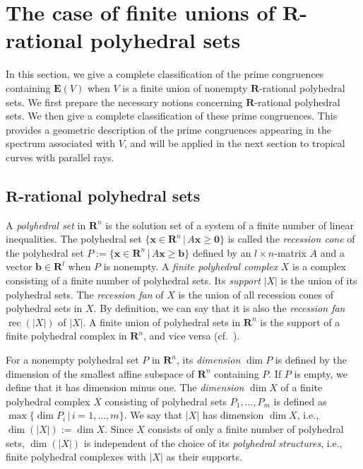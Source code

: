 \documentclass[a4paper,12pt]{amsart}
\theoremstyle{plain}
\theoremstyle{definition}
\begin{document}
\section{The case of finite unions of $\boldsymbol{R}$-rational polyhedral sets}
    \label{section4}

In this section, we give a complete classification of the prime congruences containing $\boldsymbol{E}(V)$ when $V$ is a finite union of nonempty $\boldsymbol{R}$-rational polyhedral sets.
We first prepare the necessary notions concerning $\boldsymbol{R}$-rational polyhedral sets.
We then give a complete classification of these prime congruences.
This provides a geometric description of the prime congruences appearing in the spectrum associated with $V$, and will be applied in the next section to tropical curves with parallel rays.

\subsection{$\boldsymbol{R}$-rational polyhedral sets}
    \label{subsection4.1}

A \textit{polyhedral set} in $\boldsymbol{R}^n$ is the solution set of a system of a finite number of linear inequalities.
The polyhedral set $\{ \boldsymbol{x} \in \boldsymbol{R}^n \,|\, A \boldsymbol{x} \ge \boldsymbol{0} \}$ is called the \textit{recession cone} of the polyhedral set $P := \{ \boldsymbol{x} \in \boldsymbol{R}^n \,|\, A \boldsymbol{x} \ge \boldsymbol{b} \}$ defined by an $l \times n$-matrix $A$ and a vector $\boldsymbol{b} \in \boldsymbol{R}^l$ when $P$ is nonempty.
A \textit{finite polyhedral complex} $X$ is a complex consisting of a finite number of polyhedral sets.
Its \textit{support} $|X|$ is the union of its polyhedral sets.
The \textit{recession fan} of $X$ is the union of all recession cones of polyhedral sets in $X$.
By definition, we can say that it is also the \textit{recession fan} $\operatorname{rec}(|X|)$ of $|X|$.
A finite union of polyhedral sets in $\boldsymbol{R}^n$ is the support of a finite polyhedral complex in $\boldsymbol{R}^n$, and vice versa (cf.~\cite[Proposition~4.1.1(a)]{Mikhalkin=Rau}).

For a nonempty polyhedral set $P$ in $\boldsymbol{R}^n$, its \textit{dimension} $\operatorname{dim}P$ is defined by the dimension of the smallest affine subspace of $\boldsymbol{R}^n$ containing $P$.
If $P$ is empty, we define that it has dimension minus one.
The \textit{dimension} $\operatorname{dim}X$ of a finite polyhedral complex $X$ consisting of polyhedral sets $P_1, \ldots, P_m$ is defined as $\operatorname{max}\{ \operatorname{dim}P_i \,|\, i = 1, \ldots, m\}$.
We say that $|X|$ has dimension $\operatorname{dim}X$, i.e., $\operatorname{dim}(|X|) := \operatorname{dim}X$.
Since $X$ consists of only a finite number of polyhedral sets, $\operatorname{dim}(|X|)$ is independent of the choice of its \textit{polyhedral structures}, i.e., finite polyhedral complexes with $|X|$ as their supports.
\end{document}
